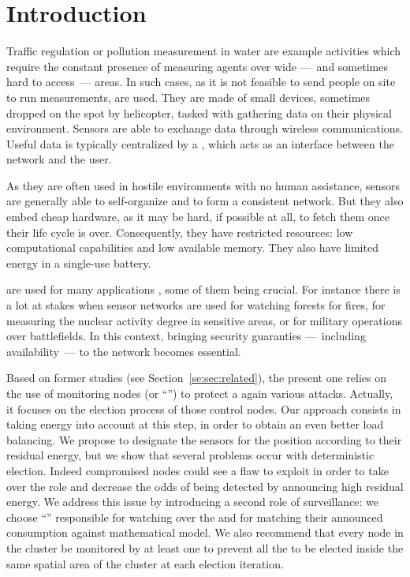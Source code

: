 \section{Introduction}

Traffic regulation or pollution measurement in water are example activities which require the constant presence of measuring agents over wide ---~and sometimes hard to access~--- areas.
In such cases, as it is not feasible to send people on site to run measurements, \wsns are used.
They are made of small devices, sometimes dropped on the spot by helicopter, tasked with gathering data on their physical environment.
Sensors are able to exchange data through wireless communications.
Useful data is typically centralized by a \bs, which acts as an interface between the network and the user.

As they are often used in hostile environments with no human assistance, sensors are generally able to self-organize and to form a consistent network.
But they also embed cheap hardware, as it may be hard, if possible at all, to fetch them once their life cycle is over.
Consequently, they have restricted resources: low computational capabilities and low available memory.
They also have limited energy%
in a single-use battery.

\Wsns are used for many applications%
, some of them being crucial.
For instance there is a lot at stakes when sensor networks are used for watching forests for fires, for measuring the nuclear activity degree in sensitive areas, or for military operations over battlefields.
In this context, bringing security guaranties ---~including availability~--- to the network becomes essential.

Based on former studies (see Section~\ref{se:sec:related}), the present one relies on the use of monitoring nodes (or ``\cns'') to protect a \wsn again various \dos attacks.
Actually, it focuses on the election process of those control nodes.
Our approach consists in taking energy into account at this step, in order to obtain an even better load balancing.
We propose to designate the sensors for the \cn position according to their residual energy, but we show that several problems occur with deterministic election.
Indeed compromised nodes could see a flaw to exploit in order to take over the \cn role and decrease the odds of being detected by announcing high residual energy.
We address this issue by introducing a second role of surveillance: we choose ``\vns'' responsible for watching over the \cns and for matching their announced consumption against mathematical model.
We also recommend that every node in the cluster be monitored by at least one \cn to prevent all the \cns to be elected inside the same spatial area of the cluster at each election iteration.

